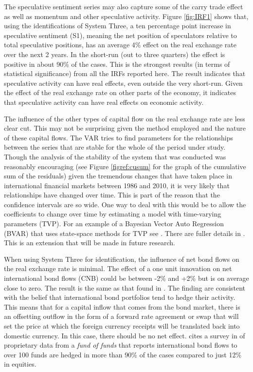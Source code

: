 \documentclass[12pt, a4paper, oneside]{article}\usepackage[]{graphicx}\usepackage[]{color}
\begin{document}
The speculative sentiment series may also capture some of the carry trade effect as well as momentum and other speculative activity.  Figure \ref{fig:IRF1} shows that, using the identifications of System Three, a ten percentage point increase in speculative sentiment (S1), meaning the net position of speculators relative to total speculative positions, has an average 4\% effect on the real exchange rate over the next 2 years.  In the short-run (out to three quarters) the effect is positive in about 90\% of the cases.   This is the strongest results (in terms of statistical significance) from all the IRFs reported here.  The result indicates that speculative activity can have real effects, even outside the very short-run. Given the effect of the real exchange rate on other parts of the economy, it indicates that speculative activity can have real effects on economic activity. 

The influence of the other types of capital flow on the real exchange rate are less clear cut.   This may not be surprising given the method employed and the nature of these capital flows.  The VAR tries to find parameters for the relationships between the series that are stable for the whole of the period under study.  Though the analysis of the stability of the system that was conducted was reasonably encouraging (see Figure \ref{figref:cusum} for the graph of the cumulative sum of the residuals) given the tremendous changes that have taken place in international financial markets between 1986 and 2010, it is very likely that relationships have changed over time.   This is part of the reason that the confidence intervals are so wide.  One way to deal with this would be to allow the coefficients to change over time by estimating a model with  time-varying parameters (TVP).  For an example of a Bayesian Vector Auto Regression (BVAR) that uses state-space methods for TVP see \citep{DelNegroFRBNY}.  There are fuller details in \citep{KoopMethods}.  This is an extension that will be made in future research.    	

When using System Three for identification, the influence of net bond flows on the real exchange rate is minimal.  The effect of a one unit innovation on net international bond flows (CNB) could be between -2\% and +2\% but is on average close to zero.  The result is the same as that found in \citep{Siourounis2004Capital}.  The finding are consistent with the belief that international bond portfolios tend to hedge their activity.  This means that for a capital inflow that comes from the bond market, there is an offsetting outflow in the form of a forward rate agreement or swap that will set the price at which the foreign currency receipts will be translated back into domestic currency. In this case, there should be no net effect. \citep[p 3]{Siourounis2004Capital} cites a survey in \citep{HauEquity} of proprietary data from a \emph{fund of funds} that reports international bond flows to over 100 funds are hedged in more than 90\% of the cases compared to just 12\% in equities.    
\end{document}
